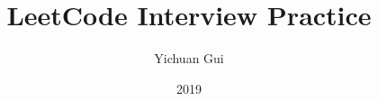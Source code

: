 \documentclass[12pt]{report}
\begin{document}
\title{\bf LeetCode Interview Practice}
\author{Yichuan Gui}
\date{2019}
\maketitle

\tableofcontents
\cleardoublepage

\newpage
\setcounter{page}{1}
\cleardoublepage














\end{document}
